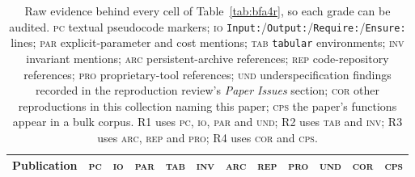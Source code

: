 \begin{table}[htbp]
\centering
\caption[BFA-4R raw evidence]{Raw evidence behind every cell of Table~\ref{tab:bfa4r}, so each grade
can be audited. \textsc{pc} textual pseudocode markers; \textsc{io}
\texttt{Input:}/\texttt{Output:}/\texttt{Require:}/\texttt{Ensure:} lines;
\textsc{par} explicit-parameter and cost mentions; \textsc{tab}
\texttt{tabular} environments; \textsc{inv} invariant mentions; \textsc{arc}
persistent-archive references; \textsc{rep} code-repository references;
\textsc{pro} proprietary-tool references; \textsc{und} underspecification
findings recorded in the reproduction review's \emph{Paper Issues} section;
\textsc{cor} other reproductions in this collection naming this paper;
\textsc{cps} the paper's functions appear in a bulk corpus. R1 uses
\textsc{pc}, \textsc{io}, \textsc{par} and \textsc{und}; R2 uses \textsc{tab}
and \textsc{inv}; R3 uses \textsc{arc}, \textsc{rep} and \textsc{pro}; R4 uses
\textsc{cor} and \textsc{cps}.}
\label{tab:bfa4r-evidence}
\scriptsize
\begin{tabular}{@{}l *{11}{r}@{}}
\toprule
Publication & \textsc{pc} & \textsc{io} & \textsc{par} & \textsc{tab} &
\textsc{inv} & \textsc{arc} & \textsc{rep} & \textsc{pro} & \textsc{und} &
\textsc{cor} & \textsc{cps} \\
\midrule

\bottomrule
\end{tabular}
\end{table}
